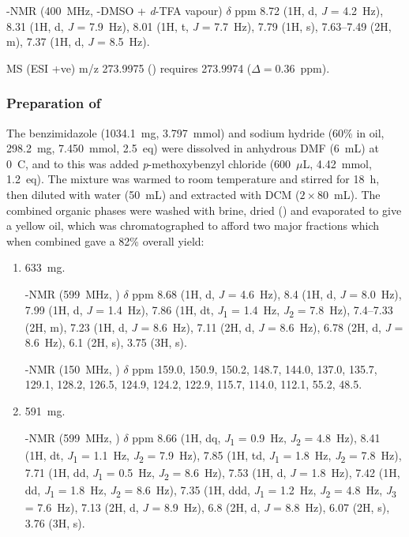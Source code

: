 \begin{refsection}
-NMR (400~MHz, -DMSO + \textit{d}-TFA vapour) $\delta$ ppm 8.72 (1H, d, \textit{J} = 4.2~Hz), 8.31 (1H, d, \textit{J} = 7.9~Hz), 8.01 (1H, t, \textit{J} = 7.7~Hz), 7.79 (1H, s), 7.63--7.49 (2H, m), 7.37 (1H, d, \textit{J} = 8.5~Hz).

MS (ESI +ve) m/z 273.9975 ()  requires 273.9974 ($\Delta=0.36$~ppm).

\subsubsection{Preparation of }
The benzimidazole  (1034.1~mg, 3.797~mmol) and sodium hydride (60\% in oil, 298.2~mg, 7.450~mmol, 2.5~eq) were dissolved in anhydrous DMF (6~mL) at 0~\degree{}C, and to this was added \textit{p}-methoxybenzyl chloride (600~$\mu$L, 4.42~mmol, 1.2~eq).
The mixture was warmed to room temperature and stirred for 18~h, then diluted with water (50~mL) and extracted with DCM ($2\times80$~mL).
The combined organic phases were washed with brine, dried () and evaporated to give a yellow oil, which was chromatographed to afford two major fractions which when combined gave a 82\% overall yield:
\begin{enumerate}
    \item 633~mg.
    
    -NMR (599~MHz, ) $\delta$ ppm 8.68 (1H, d, \textit{J} = 4.6~Hz), 8.4 (1H, d, \textit{J} = 8.0~Hz), 7.99 (1H, d, \textit{J} = 1.4~Hz), 7.86 (1H, dt, \textit{J}\textsubscript{1} = 1.4~Hz, \textit{J}\textsubscript{2} = 7.8~Hz), 7.4--7.33 (2H, m), 7.23 (1H, d, \textit{J} = 8.6~Hz), 7.11 (2H, d, \textit{J} = 8.6~Hz), 6.78 (2H, d, \textit{J} = 8.6~Hz), 6.1 (2H, s), 3.75 (3H, s).

    -NMR (150~MHz, ) $\delta$ ppm 159.0, 150.9, 150.2, 148.7, 144.0, 137.0, 135.7, 129.1, 128.2, 126.5, 124.9, 124.2, 122.9, 115.7, 114.0, 112.1, 55.2, 48.5.

    \item 591~mg.
    
    -NMR (599~MHz, ) $\delta$ ppm 8.66 (1H, dq, \textit{J}\textsubscript{1} = 0.9~Hz, \textit{J}\textsubscript{2} = 4.8~Hz), 8.41 (1H, dt, \textit{J}\textsubscript{1} = 1.1~Hz, \textit{J}\textsubscript{2} = 7.9~Hz), 7.85 (1H, td, \textit{J}\textsubscript{1} = 1.8~Hz, \textit{J}\textsubscript{2} = 7.8~Hz), 7.71 (1H, dd, \textit{J}\textsubscript{1} = 0.5~Hz, \textit{J}\textsubscript{2} = 8.6~Hz), 7.53 (1H, d, \textit{J} = 1.8~Hz), 7.42 (1H, dd, \textit{J}\textsubscript{1} = 1.8~Hz, \textit{J}\textsubscript{2} = 8.6~Hz), 7.35 (1H, ddd, \textit{J}\textsubscript{1} = 1.2~Hz, \textit{J}\textsubscript{2} = 4.8~Hz, \textit{J}\textsubscript{3} = 7.6~Hz), 7.13 (2H, d, \textit{J} = 8.9~Hz), 6.8 (2H, d, \textit{J} = 8.8~Hz), 6.07 (2H, s), 3.76 (3H, s).


\end{enumerate}
\end{refsection}
